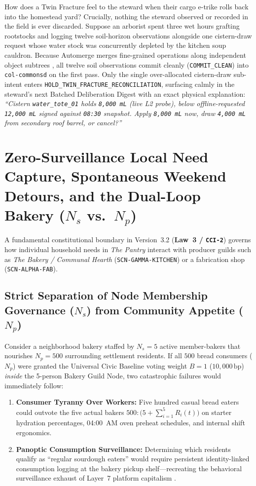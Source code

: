 How does a Twin Fracture feel to the steward when their cargo e-trike rolls back into the homestead yard? Crucially, nothing the steward observed or recorded in the field is ever discarded. Suppose an arborist spent three wet hours grafting rootstocks and logging twelve soil-horizon observations alongside one cistern-draw request whose water stock was concurrently depleted by the kitchen soup cauldron. Because Automerge merges fine-grained operations along independent object subtrees \parencite{kleppmann2017automerge}, all twelve soil observations commit cleanly (\texttt{COMMIT\_CLEAN}) into \texttt{col-commonsd} on the first pass. Only the single over-allocated cistern-draw sub-intent enters \texttt{HOLD\_TWIN\_FRACTURE\_RECONCILIATION}, surfacing calmly in the steward's next Batched Deliberation Digest with an exact physical explanation: \emph{``Cistern \texttt{water\_tote\_01} holds \texttt{8,000 mL} (live L2 probe), below offline-requested \texttt{12,000 mL} signed against \texttt{08:30} snapshot. Apply \texttt{8,000 mL} now, draw \texttt{4,000 mL} from secondary roof barrel, or cancel?''}

\section{Zero-Surveillance Local Need Capture, Spontaneous Weekend Detours, and the Dual-Loop Bakery ($N_s$ vs.\ $N_p$)}
\label{sec:zero-surveillance-need-capture}

A fundamental constitutional boundary in Version~3.2 (\textbf{Law~3 / \texttt{CCI-2}}) governs how individual household needs in \textit{The Pantry} interact with producer guilds such as \textit{The Bakery / Communal Hearth} (\texttt{SCN-GAMMA-KITCHEN}) or a fabrication shop (\texttt{SCN-ALPHA-FAB}).

\subsection{Strict Separation of Node Membership Governance ($N_s$) from Community Appetite ($N_p$)}

Consider a neighborhood bakery staffed by $N_s = 5$ active member-bakers that nourishes $N_p = 500$ surrounding settlement residents. If all $500$ bread consumers ($N_p$) were granted the Universal Civic Baseline voting weight $B = 1$ ($10{,}000\,\mathrm{bp}$) \emph{inside} the 5-person Bakery Guild Node, two catastrophic failures would immediately follow:
\begin{enumerate}
    \item \textbf{Consumer Tyranny Over Workers:} Five hundred casual bread eaters could outvote the five actual bakers $500 : \bigl(5 + \sum_{i=1}^{5} R_i(t)\bigr)$ on starter hydration percentages, 04:00~AM oven preheat schedules, and internal shift ergonomics.
    \item \textbf{Panoptic Consumption Surveillance:} Determining which residents qualify as ``regular sourdough eaters'' would require persistent identity-linked consumption logging at the bakery pickup shelf---recreating the behavioral surveillance exhaust of Layer~7 platform capitalism \parencite{zuboff2019}.
\end{enumerate}

